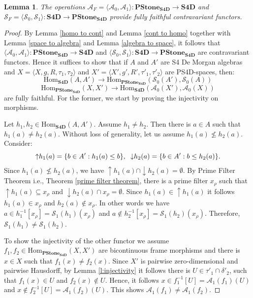 \documentclass{amsart}
\theoremstyle{plain}
\newtheorem{lemma}[theorem]{Lemma}
\newcommand{\Hom}{\ensuremath{\mathrm{Hom}}}
\theoremstyle{definition}
\begin{document}
\begin{lemma} The operations
$\mathcal{A}_F=\langle\mathcal{A}_0,\mathcal{A}_1\rangle\colon\mathbf{PStone_{S4D}}\to\mathbf{S4D}$ and $\mathcal{S}_F=\langle\mathcal{S}_0,\mathcal{S}_1\rangle\colon\mathbf{S4D}\to\mathbf{PStone_{S4D}}$ provide fully faithful contravariant functors.  
\end{lemma}
\begin{proof}
    By Lemma \ref{homo to cont} and Lemma \ref{cont to homo} together with Lemma \ref{space to algebra} and Lemma \ref{algebra to space}, it follows that $\langle\mathcal{A}_0,\mathcal{A}_1\rangle\colon\mathbf{PStone_{S4D}}\to\mathbf{S4D}$ and $\langle\mathcal{S}_0,\mathcal{S}_1\rangle\colon\mathbf{S4D}\to\mathbf{PStone_{S4D}}$ are contravariant functors. Hence it suffices to show that if $A$ and $A'$ are S4 De Morgan algebras and $X = \langle X, g, R, \tau_1, \tau_2 \rangle$ and $X' = \langle X', g', R', \tau'_1, \tau'_2 \rangle$ are PS4D-spaces, then: 
    \[\Hom_{\mathbf{S4D}}(A,A')\to\Hom_{\mathbf{PStone_{S4D}}}(\mathcal{S}_0(A'),\mathcal{S}_0(A))\]
     \[\Hom_{\mathbf{PStone_{S4D}}}(X,X')\to\Hom_{\mathbf{S4D}}(\mathcal{A}_0(X'),\mathcal{A}_0(X))\] are fully faithful. For the former, we start by proving the injectivity on morphisms.

     Let $h_1,h_2 \in \Hom_{\mathbf{S4D}}(A,A')$. Assume $h_1 \neq h_2$. Then there is $a \in A$ such that $h_1(a) \neq h_2(a)$. Without loss of generality, let us assume $h_1(a) \nleq h_2(a)$.
     Consider: 
     \[{\uparrow} h_1(a)=\{b \in A' : h_1(a) \leq b\},\hspace{.2cm}{\downarrow} h_2(a)=\{b \in A' :  b \leq h_2(a)\}.\]
     Since $h_1(a) \nleq h_2(a)$, we have ${\uparrow} h_1(a) \cap {\downarrow} h_2(a)= \emptyset$. By Prime Filter Theorem i.e., Theorem \ref{prime filter theorem}, there is a prime filter $x_\rho$ such that ${\uparrow} h_1(a) \subseteq x_\rho$ and ${\downarrow} h_2(a) \cap x_\rho = \emptyset$. Since $h_1(a) \in {\uparrow} h_1(a)$ it follows $h_1(a) \in x_\rho$ and $h_2(a) \notin x_\rho$.
     In other words we have $a \in h_1^{-1}[x_\rho] = \mathcal{S}_1(h_1)(x_\rho)$ and $a \notin h_2^{-1}[x_\rho] = \mathcal{S}_1(h_2)(x_\rho)$. Therefore, $\mathcal{S}_1(h_1) \neq \mathcal{S}_1(h_2)$.

     To show the injectivity of the other functor we assume $f_1,f_2\in \Hom_{\mathbf{PStone}_{\mathbf{S4D}}}(X,X')$ are bicontinuous frame morphisms and there is $x \in X$ such that $f_1(x) \neq f_2(x)$. Since $X'$ is pairwise zero-dimensional and pairwise Hausdorff, by Lemma \ref{l:injectivity} it follows there is $U \in \tau'_1 \cap \delta'_2$, such that $f_1(x) \in U$ and $f_2(x) \notin U$. Hence, it follows 
    $x\in f_1^{-1}[U]=\mathcal{A}_1(f_1)(U)$ and $x \notin f_2^{-1}[U]=\mathcal{A}_1(f_2)(U)$.
    This shows $\mathcal{A}_1(f_1) \neq \mathcal{A}_1(f_2)$.


\end{proof}
\end{document}
